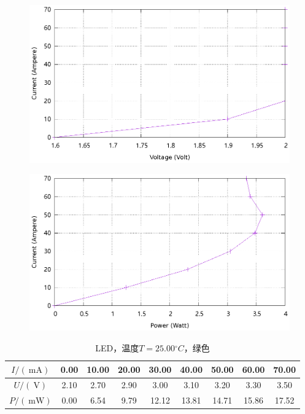 \documentclass{ctexart}
\newcommand{\si}[1]{\  \mathrm{#1}}
\begin{document}
\begin{figure}[H]
    \centering
    \includegraphics[width=0.9\linewidth]{../output/led-vc-3.gnuplot}
\end{figure}
\begin{figure}[H]
    \centering
    \includegraphics[width=0.9\linewidth]{../output/led-pc-3.gnuplot}
\end{figure}
\newpage
\begin{table}[H]
    \centering
    \begin{tabular}{|c|c|c|c|c|c|c|c|c|}
        \hline
        $I/(\si{mA})$   & 0.00 & 10.00 & 20.00 & 30.00 & 40.00 & 50.00 & 60.00 & 70.00 \\\hline
        $U / (\si{V})$  & 2.10 & 2.70 & 2.90 & 3.00 & 3.10 & 3.20 & 3.30 & 3.50 \\\hline
        $P / (\si{mW})$ & 0.00 & 6.54 & 9.79 & 12.12 & 13.81 & 14.71 & 15.86 & 17.52 \\\hline
    \end{tabular}
    \caption{LED，温度$T=25.00{}^{\circ}C$，绿色}
\end{table}
\end{document}
